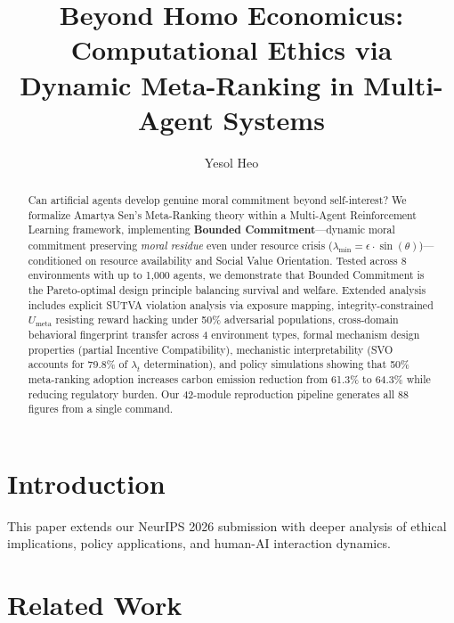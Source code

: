 \documentclass[sigconf]{acmart}
\title{Beyond Homo Economicus: Computational Ethics via\\
Dynamic Meta-Ranking in Multi-Agent Systems}
\author{Yesol Heo}
\affiliation{%
  \institution{Independent Researcher}
  \city{Seoul}
  \country{South Korea}}
\begin{document}
\begin{abstract}
Can artificial agents develop genuine moral commitment beyond self-interest?
We formalize Amartya Sen's Meta-Ranking theory within a Multi-Agent Reinforcement Learning framework, implementing \textbf{Bounded Commitment}---dynamic moral commitment preserving \textit{moral residue} even under resource crisis ($\lambda_{\min} = \epsilon \cdot \sin(\theta)$)---conditioned on resource availability and Social Value Orientation. Tested across 8 environments with up to 1,000 agents, we demonstrate that Bounded Commitment is the Pareto-optimal design principle balancing survival and welfare. Extended analysis includes explicit SUTVA violation analysis via exposure mapping, integrity-constrained $U_{\text{meta}}$ resisting reward hacking under 50\% adversarial populations, cross-domain behavioral fingerprint transfer across 4 environment types, formal mechanism design properties (partial Incentive Compatibility), mechanistic interpretability (SVO accounts for 79.8\% of $\lambda_t$ determination), and policy simulations showing that 50\% meta-ranking adoption increases carbon emission reduction from 61.3\% to 64.3\% while reducing regulatory burden. Our 42-module reproduction pipeline generates all 88 figures from a single command.
\end{abstract}

\maketitle

\section{Introduction}

This paper extends our NeurIPS 2026 submission with deeper analysis of ethical implications,
policy applications, and human-AI interaction dynamics.

\section{Related Work}
\end{document}
